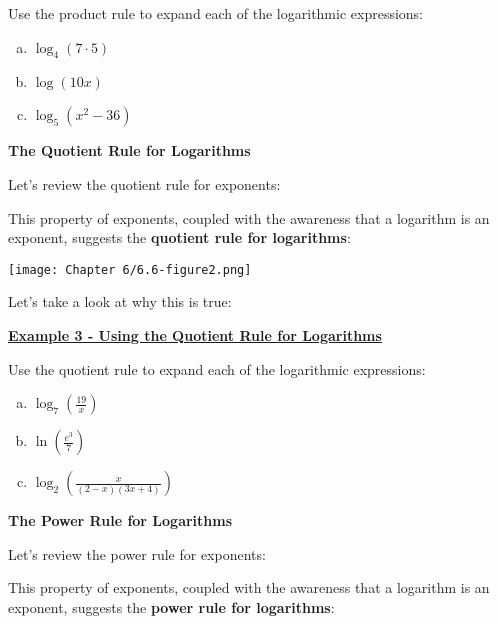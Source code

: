 \documentclass[12pt]{book}
\newcommand{\D}{\displaystyle}
\begin{document}
Use the product rule to expand each of the logarithmic expressions:
\begin{multicols}{3}
    \begin{enumerate}[(a)]
    \item $\D \log_4(7\cdot5)$
    \item $\D \log(10x)$
    \item $\D \log_5(x^2-36)$
\end{enumerate}
\end{multicols}

\newpage

\textbf{{\large The Quotient Rule for Logarithms}}

Let's review the quotient rule for exponents:


\vspace{20mm}

This property of exponents, coupled with the awareness that a logarithm is an exponent, suggests the \textbf{quotient rule for logarithms}:
\vspace{1mm}

\centerline{\texttt{[image: Chapter 6/6.6-figure2.png]}}
Let's take a look at why this is true:

\vspace{50mm}

\underline{\textbf{Example 3 - Using the Quotient Rule for Logarithms}}

Use the quotient rule to expand each of the logarithmic expressions:
\begin{multicols}{3}
    \begin{enumerate}[(a)]
    \item $\D \log_7\left(\frac{19}{x}\right)$
    \item $\D \ln\left(\frac{e^3}{7}\right)$
    \item $\D \log_2\left(\frac{x}{(2-x)(3x+4)}\right)$
\end{enumerate}
\end{multicols}

\newpage


\textbf{{\large The Power Rule for Logarithms}}

Let's review the power rule for exponents:


\vspace{20mm}

This property of exponents, coupled with the awareness that a logarithm is an exponent, suggests the \textbf{power rule for logarithms}:
\vspace{1mm}
\end{document}
